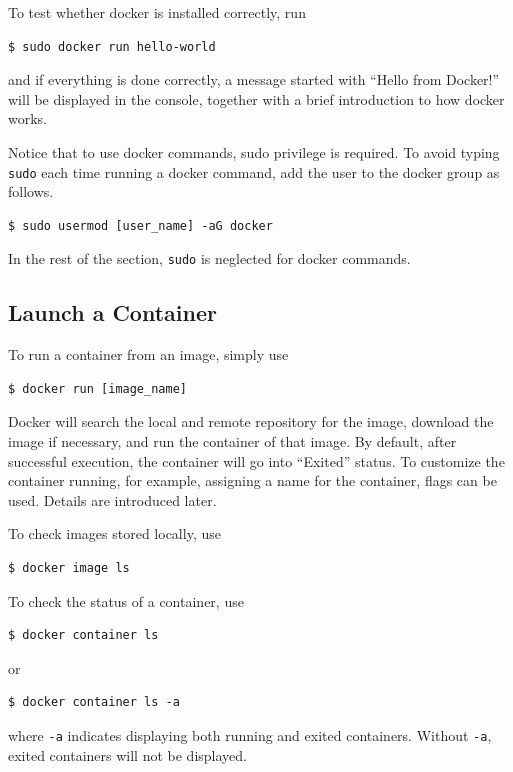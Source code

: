 To test whether docker is installed correctly, run
\begin{lstlisting}
$ sudo docker run hello-world
\end{lstlisting}
and if everything is done correctly, a message started with ``Hello from Docker!'' will be displayed in the console, together with a brief introduction to how docker works.

Notice that to use docker commands, sudo privilege is required. To avoid typing \verb|sudo| each time running a docker command, add the user to the docker group as follows.
\begin{lstlisting}
$ sudo usermod [user_name] -aG docker
\end{lstlisting}

In the rest of the section, \verb|sudo| is neglected for docker commands.

\subsection{Launch a Container}

To run a container from an image, simply use
\begin{lstlisting}
$ docker run [image_name]
\end{lstlisting}
Docker will search the local and remote repository for the image, download the image if necessary, and run the container of that image. By default, after successful execution, the container will go into ``Exited'' status. To customize the container running, for example, assigning a name for the container, flags can be used. Details are introduced later.

To check images stored locally, use
\begin{lstlisting}
$ docker image ls
\end{lstlisting}

To check the status of a container, use
\begin{lstlisting}
$ docker container ls
\end{lstlisting}
or
\begin{lstlisting}
$ docker container ls -a
\end{lstlisting}
where \verb|-a| indicates displaying both running and exited containers. Without \verb|-a|, exited containers will not be displayed.

